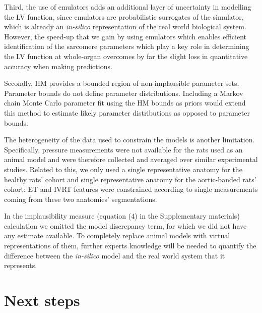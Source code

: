 \vspace{0.2cm}
Third, the use of emulators adds an additional layer of uncertainty in modelling the LV function, since emulators are probabilistic surrogates of the simulator, which is already an \textit{in-silico} representation of the real world biological system. However, the speed-up that we gain by using emulators which enables efficient identification of the sarcomere parameters which play a key role in determining the LV function at whole-organ overcomes by far the slight loss in quantitative accuracy when making predictions.

Secondly, HM provides a bounded region of non-implausible parameter sets. Parameter bounds do not define parameter distributions. Including a Markov chain Monte Carlo parameter fit using the HM bounds as priors would extend this method to estimate likely parameter distributions as opposed to parameter bounds.

\vspace{0.2cm}
The heterogeneity of the data used to constrain the models is another limitation. Specifically, pressure measurements were not available for the rats used as an animal model and were therefore collected and averaged over similar experimental studies. Related to this, we only used a single representative anatomy for the healthy rats' cohort and single representative anatomy for the aortic-banded rats' cohort: ET and IVRT features were constrained according to single measurements coming from these two anatomies' segmentations.

\vspace{0.2cm}
In the implausibility measure (equation ($4$) in the Supplementary materials) calculation we omitted the model discrepancy term, for which we did not have any estimate available. To completely replace animal models with virtual representations of them, further experts knowledge will be needed to quantify the difference between the \textit{in-silico} model and the real world system that it represents.


%
%
%
\section{Next steps}\label{sec:ch9next_steps}